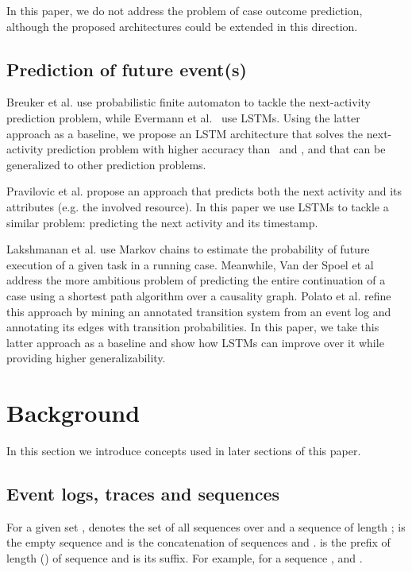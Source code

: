 \documentclass[runningheads,a4paper]{llncs}
\begin{document}
In this paper, we do not address the problem of case outcome prediction, although the proposed architectures could be extended in this direction. 






\subsection{Prediction of future event(s)}
Breuker et al. \cite{Breuker2016} use probabilistic finite automaton to tackle the next-activity prediction problem, while Evermann et al.~\cite{Evermann2016} use LSTMs. Using the latter approach as a baseline, we propose an LSTM architecture that solves the next-activity prediction problem with higher accuracy than~\cite{Evermann2016} and \cite{Breuker2016}, and that can be generalized to other prediction problems.

Pravilovic et al. \cite{Pravilovic2013} propose an approach that predicts both the next activity and its attributes (e.g. the involved resource). In this paper we use LSTMs to tackle a similar problem: predicting the next activity and its timestamp. 

Lakshmanan et al. \cite{Lakshmanan2015} use Markov chains to estimate the probability of future execution of a given task in a running case. 
Meanwhile, Van der Spoel et al \cite{Spoel2012} address the more ambitious problem of predicting the entire continuation of a case using a shortest path algorithm over a causality graph. Polato et al. \cite{Polato2016} refine this approach by mining an annotated transition system from an event log and annotating its edges with transition probabilities. In this paper, we take this latter approach as a baseline and show how LSTMs can improve over it while providing higher generalizability.

 
\section{Background}
\label{sec:preliminaries}
In this section we introduce concepts used in later sections of this paper.

\subsection{Event logs, traces and sequences}
For a given set ,  denotes the set of all sequences over  and  a sequence of length ;  is the empty sequence and  is the concatenation of sequences  and .  is the prefix of length  () of sequence  and  is its suffix. For example, for a sequence ,  and .
\end{document}
